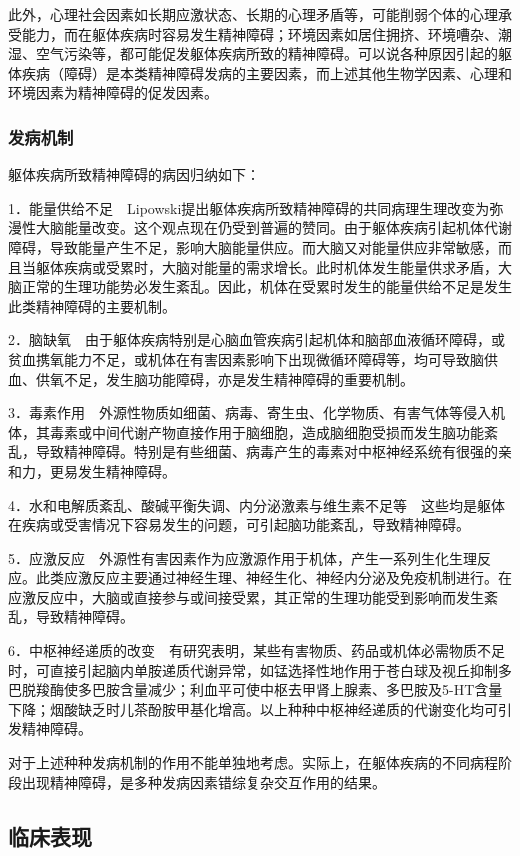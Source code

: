 此外，心理社会因素如长期应激状态、长期的心理矛盾等，可能削弱个体的心理承受能力，而在躯体疾病时容易发生精神障碍；环境因素如居住拥挤、环境嘈杂、潮湿、空气污染等，都可能促发躯体疾病所致的精神障碍。可以说各种原因引起的躯体疾病（障碍）是本类精神障碍发病的主要因素，而上述其他生物学因素、心理和环境因素为精神障碍的促发因素。

\subsubsection{发病机制}

躯体疾病所致精神障碍的病因归纳如下：

1．能量供给不足　Lipowski提出躯体疾病所致精神障碍的共同病理生理改变为弥漫性大脑能量改变。这个观点现在仍受到普遍的赞同。由于躯体疾病引起机体代谢障碍，导致能量产生不足，影响大脑能量供应。而大脑又对能量供应非常敏感，而且当躯体疾病或受累时，大脑对能量的需求增长。此时机体发生能量供求矛盾，大脑正常的生理功能势必发生紊乱。因此，机体在受累时发生的能量供给不足是发生此类精神障碍的主要机制。

2．脑缺氧　由于躯体疾病特别是心脑血管疾病引起机体和脑部血液循环障碍，或贫血携氧能力不足，或机体在有害因素影响下出现微循环障碍等，均可导致脑供血、供氧不足，发生脑功能障碍，亦是发生精神障碍的重要机制。

3．毒素作用　外源性物质如细菌、病毒、寄生虫、化学物质、有害气体等侵入机体，其毒素或中间代谢产物直接作用于脑细胞，造成脑细胞受损而发生脑功能紊乱，导致精神障碍。特别是有些细菌、病毒产生的毒素对中枢神经系统有很强的亲和力，更易发生精神障碍。

4．水和电解质紊乱、酸碱平衡失调、内分泌激素与维生素不足等　这些均是躯体在疾病或受害情况下容易发生的问题，可引起脑功能紊乱，导致精神障碍。

5．应激反应　外源性有害因素作为应激源作用于机体，产生一系列生化生理反应。此类应激反应主要通过神经生理、神经生化、神经内分泌及免疫机制进行。在应激反应中，大脑或直接参与或间接受累，其正常的生理功能受到影响而发生紊乱，导致精神障碍。

6．中枢神经递质的改变　有研究表明，某些有害物质、药品或机体必需物质不足时，可直接引起脑内单胺递质代谢异常，如锰选择性地作用于苍白球及视丘抑制多巴脱羧酶使多巴胺含量减少；利血平可使中枢去甲肾上腺素、多巴胺及5-HT含量下降；烟酸缺乏时儿茶酚胺甲基化增高。以上种种中枢神经递质的代谢变化均可引发精神障碍。

对于上述种种发病机制的作用不能单独地考虑。实际上，在躯体疾病的不同病程阶段出现精神障碍，是多种发病因素错综复杂交互作用的结果。

\subsection{临床表现}

